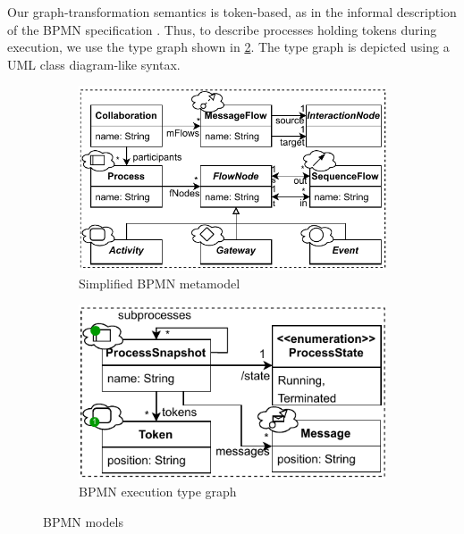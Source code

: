 \documentclass[submission, copyright, creativecommons]{eptcs}
\begin{document}
Our graph-transformation semantics is token-based, as in the informal description of the BPMN specification \cite{objectmanagementgroupBusinessProcessModel2013}.
Thus, to describe processes holding tokens during execution, we use the type graph shown in \cref{fig:typeGraph}.
The type graph is depicted using a UML class diagram-like syntax.

\begin{figure}
\centering
\begin{subfigure}{.5\textwidth}
  \centering
  \includegraphics[width=1\linewidth]{images/bpmn_semantics-bpmn-metamodel.pdf}
  \caption{Simplified BPMN metamodel \cite{objectmanagementgroupBusinessProcessModel2013}}
  \label{fig:bpmnMetamodel}
\end{subfigure}%
\begin{subfigure}{.50\textwidth}
  \centering
  \includegraphics[width=1\linewidth]{images/bpmn_semantics-typegraph.pdf}
  \caption{BPMN execution type graph}
  \label{fig:typeGraph}
\end{subfigure}
\caption{BPMN models}
\label{fig:test}
\end{figure}
\end{document}
